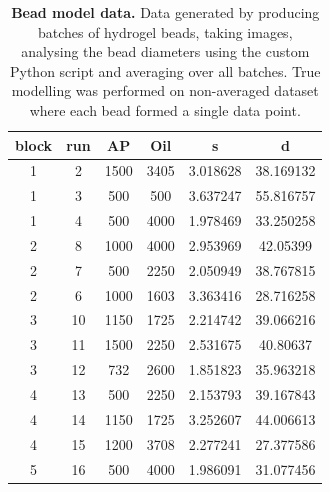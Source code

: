 \begin{appendix}
\begin{table}[ht]
\begin{center}
\begin{tabular}{cc|cc|cc}
block & run & AP          & Oil         & s        & d         \\
\hline
1     & 2   & 1500        & 3405        & 3.018628 & 38.169132 \\
1     & 3   & 500         & 500         & 3.637247 & 55.816757 \\
1     & 4   & 500         & 4000        & 1.978469 & 33.250258 \\
2     & 8   & 1000        & 4000        & 2.953969 & 42.05399  \\
2     & 7   & 500         & 2250        & 2.050949 & 38.767815 \\
2     & 6   & 1000        & 1603     	& 3.363416 & 28.716258 \\
3     & 10  & 1150        & 1725        & 2.214742 & 39.066216 \\
3     & 11  & 1500        & 2250        & 2.531675 & 40.80637  \\
3     & 12  & 732	  & 2600        & 1.851823 & 35.963218 \\
4     & 13  & 500         & 2250        & 2.153793 & 39.167843 \\
4     & 14  & 1150        & 1725        & 3.252607 & 44.006613 \\
4     & 15  & 1200        & 3708	& 2.277241 & 27.377586 \\
5     & 16  & 500         & 4000        & 1.986091 & 31.077456
\end{tabular}
\end{center}
\caption[Bead model data]{\textbf{Bead model data.} Data generated by producing batches of hydrogel beads, taking images, analysing the bead diameters using the custom Python script and averaging over all batches. True modelling was performed on non-averaged dataset where each bead formed a single data point.}
\label{table:bead_data}
\end{table}


\end{appendix}
